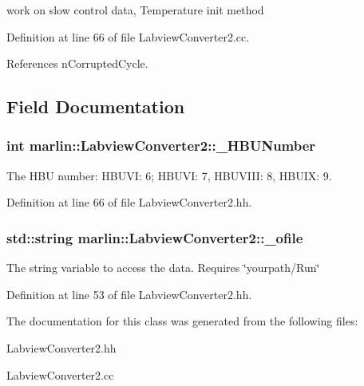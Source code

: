 work on slow control data, Temperature init method 

Definition at line 66 of file LabviewConverter2.cc.

References nCorruptedCycle.

\subsection{Field Documentation}
\subsubsection[{\_\-HBUNumber}]{\setlength{\rightskip}{0pt plus 5cm}int {\bf marlin::LabviewConverter2::\_\-HBUNumber}\hspace{0.3cm}{\ttfamily  [protected]}}\label{classmarlin_1_1LabviewConverter2_a8dc9c62b6c335f9af82b17b00b7c6c1b}


The HBU number: HBUVI: 6; HBUVI: 7, HBUVIII: 8, HBUIX: 9. 

Definition at line 66 of file LabviewConverter2.hh.
\subsubsection[{\_\-ofile}]{\setlength{\rightskip}{0pt plus 5cm}std::string {\bf marlin::LabviewConverter2::\_\-ofile}\hspace{0.3cm}{\ttfamily  [protected]}}\label{classmarlin_1_1LabviewConverter2_a71f598537b02b4a46c1c2622dbac8d9e}


The string variable to access the data. Requires \char`\"{}yourpath/Run\char`\"{} 

Definition at line 53 of file LabviewConverter2.hh.

The documentation for this class was generated from the following files:\begin{DoxyCompactItemize}
\item 
LabviewConverter2.hh\item 
LabviewConverter2.cc\end{DoxyCompactItemize}
